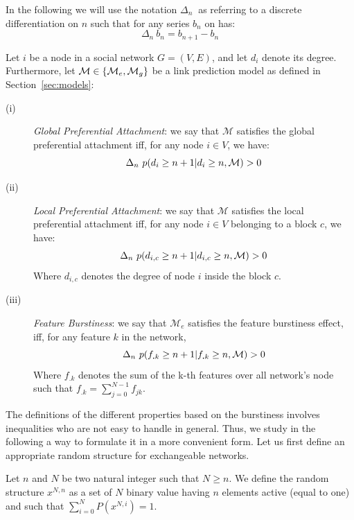 In the following we will use the notation $\Delta_n\ $ as referring to a discrete differentiation on $n$ such that for any series $b_n$ on has:
\begin{equation}
    \Delta_n\  b_n = b_{n+1} - b_n
\end{equation}


\begin{definition}
Let $i$ be a node in a social network $G=(V,E)$, and let $d_i$ denote its degree. Furthermore, let $\mathcal{M} \in \{\mathcal{M}_e, \mathcal{M}_g\}$ be a link prediction model as defined in Section~\ref{sec:models}: 
\begin{description}
\item[(i)] \emph{Global Preferential Attachment}: we say that $\mathcal{M}$ satisfies the global preferential attachment iff, for any node $i \in V$, we have:
 \begin{equation}
 \Delta_n\  p(d_i \geq n+1 | d_i \geq n,  \mathcal{M}) > 0
 \end{equation}
\item[(ii)] \emph{Local Preferential Attachment}: we say that $\mathcal{M}$ satisfies the local preferential attachment iff, for any node $i \in V$  belonging to a block $c$, we have:
  \begin{equation}
 \Delta_n\  p(d_{i,c} \geq n+1 | d_{i,c} \geq n,  \mathcal{M}) > 0
 \end{equation}
  Where $d_{i,c}$ denotes the degree of node $i$ inside the block $c$.
\item[(iii)] \emph{Feature Burstiness}: we say that $\mathcal{M}_e$ satisfies the feature burstiness effect, iff, for any feature $k$ in the network,   
  \begin{equation}
	\Delta_n\  p(f_{\bm{.}k} \geq n+1 | f_{\bm{.}k} \geq n,  \mathcal{M}) > 0
  \end{equation}
   Where $f_{\bm{.}k}$ denotes the sum of the k-th features over all network's node such that $f_{\bm{.}k} = \sum_{j=0}^{N-1} f_{jk}$.
\end{description}
\label{def:burst-soc-net}
\end{definition}
%
The definitions of the different properties based on the burstiness involves inequalities who are not easy to handle in general. Thus, we study in the following a way to formulate it in a more convenient form. Let us first define an appropriate random structure for exchangeable networks.

\begin{definition}
	Let $n$ and $N$ be two natural integer such that $N \geq n$. We define the random structure $x^{N,n}$ as a set of $N$ binary value having $n$ elements active (equal to one) and such that $\sum_{i=0}^N P(x^{N,i}) = 1$.
	\label{def:rd_struct}
\end{definition}

